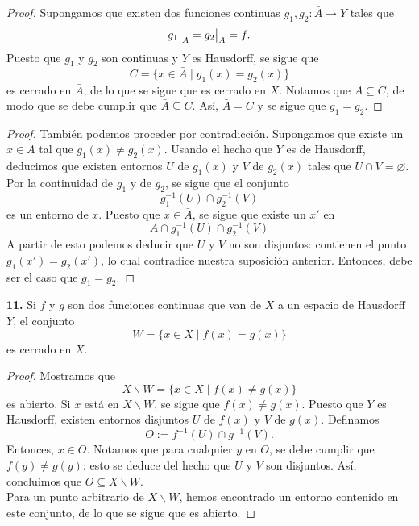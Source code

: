 \documentclass{article}
\newcommand\restr[2]{{%
		\left.\kern-\nulldelimiterspace %
		#1 %
		\vphantom{\big|} %
		\right|_{#2} %
}}
\begin{document}
\begin{proof}
Supongamos que existen dos funciones continuas $g_{1}, g_{2}: \bar{A} \rightarrow Y$ tales que
	$$ \restr{g_{1}}{A} = \restr{g_{2}}{A} = f.  $$
	Puesto que $g_{1}$ y $g_{2}$ son continuas y $Y$ es Hausdorff, se sigue que
	$$ C = \{ x \in \bar{A} \mid g_{1}(x) = g_{2}(x) \} $$
	es cerrado en $\bar{A}$, de lo que se sigue que es cerrado en $X$. Notamos que $A \subseteq C$, de modo que se debe cumplir que $\bar{A} \subseteq C$. Así, $\bar{A} = C$ y se sigue que $g_{1} = g_{2}$.
\end{proof}

\begin{proof}
	También podemos proceder por contradicción. Supongamos que existe un $x \in \bar{A}$ tal que $g_{1}(x) \neq g_{2}(x)$. Usando el hecho que $Y$ es de Hausdorff, deducimos que existen entornos $U$ de $g_{1}(x)$ y $V$ de $g_{2}(x)$ tales que $U \cap V = \varnothing$. Por la continuidad de $g_{1}$ y de $g_{2}$, se sigue que el conjunto
	$$ g_{1}^{-1}(U) \cap g_{2}^{-1}(V) $$
	es un entorno de $x$. Puesto que $x \in \bar{A}$, se sigue que existe un $x'$ en
	$$ A \cap g_{1}^{-1}(U) \cap g_{2}^{-1}(V) $$
	A partir de esto podemos deducir que $U$ y $V$ no son disjuntos: contienen el punto $g_{1}(x') = g_{2}(x')$, lo cual contradice nuestra suposición anterior. Entonces, debe  ser el caso que $g_{1} = g_{2}$. 
\end{proof}
	
\begin{mybox}
	\textbf{11.} Si $f$ y $g$ son dos funciones continuas que van de $X$ a un espacio de Hausdorff $Y$, el conjunto
	$$ W =  \{ x \in X \mid f(x) = g(x)  \} $$
	es cerrado en $X$.
\end{mybox}
\begin{proof}
	Mostramos que 
	$$ X \backslash W = \{ x \in X \mid f(x) \neq g(x) \} $$
	es abierto. Si $x$ está en $X \backslash W$, se sigue que $f(x) \neq g(x)$. Puesto que $Y$ es Hausdorff, existen entornos disjuntos $U$ de $f(x)$ y $V$ de $g(x)$. Definamos 
	$$ O := f^{-1}(U) \cap g^{-1}(V). $$
	Entonces, $x \in O$.  Notamos que para cualquier $y$ en $O$, se debe cumplir que $f(y) \neq g(y)$: esto se deduce del hecho que $U$ y $V$ son disjuntos. Así, concluimos que $O \subseteq X \backslash W$. \\
	Para un punto arbitrario de $X \backslash W$, hemos encontrado un entorno contenido en este conjunto, de lo que se sigue que es abierto. 	
\end{proof}	
\end{document}
